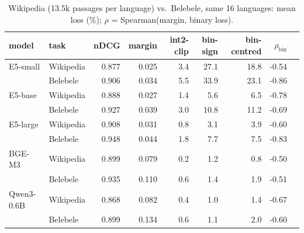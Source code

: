 \begin{table}[t]\centering\footnotesize
\begin{tabular}{llrrrrrrr}
\toprule
model & task & nDCG & margin & int2-clip & bin-sign & bin-centred & $\rho_{\mathrm{bin}}$ \\
\midrule
E5-small & Wikipedia & 0.877 & 0.025 & 3.4 & 27.1 & 18.8 & -0.54 \\
 & Belebele & 0.906 & 0.034 & 5.5 & 33.9 & 23.1 & -0.86 \\
E5-base & Wikipedia & 0.888 & 0.027 & 1.4 & 5.6 & 6.5 & -0.78 \\
 & Belebele & 0.927 & 0.039 & 3.0 & 10.8 & 11.2 & -0.69 \\
E5-large & Wikipedia & 0.908 & 0.031 & 0.8 & 3.1 & 3.9 & -0.60 \\
 & Belebele & 0.948 & 0.044 & 1.8 & 7.7 & 7.5 & -0.83 \\
BGE-M3 & Wikipedia & 0.899 & 0.079 & 0.2 & 1.2 & 0.8 & -0.50 \\
 & Belebele & 0.935 & 0.110 & 0.6 & 1.4 & 1.9 & -0.51 \\
Qwen3-0.6B & Wikipedia & 0.868 & 0.082 & 0.4 & 1.0 & 1.4 & -0.67 \\
 & Belebele & 0.899 & 0.134 & 0.6 & 1.1 & 2.0 & -0.60 \\
\bottomrule
\end{tabular}
\caption{Wikipedia (13.5k passages per language) vs.\ Belebele, same 16 languages: mean loss (\%); $\rho$ = Spearman(margin, binary loss).}\label{tab:wiki}
\end{table}